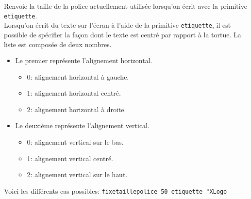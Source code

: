 Renvoie la taille de la police actuellement utilisée lorsqu'on écrit avec la primitive \texttt{etiquette}.\\
Lorsqu'on écrit du texte sur l'écran à l'aide de la primitive \texttt{etiquette}, il est possible de spécifier la façon dont le texte est centré par rapport à la tortue. La liste est composée de deux nombres.
\begin{itemize}
 \item Le premier représente l'alignement horizontal.
	\begin{itemize}
 	\item 0: alignement horizontal à gauche.
	\item 1: alignement horizontal centré.
	\item 2: alignement horizontal à droite.
	\end{itemize}
 \item Le deuxième représente l'alignement vertical.
	\begin{itemize}
 	\item 0: alignement vertical sur le bas.
	\item 1: alignement vertical centré.
	\item 2: alignement vertical sur le haut.
	\end{itemize}
\end{itemize}
Voici les différents cas possibles:
\texttt{fixetaillepolice 50 etiquette "XLogo}
